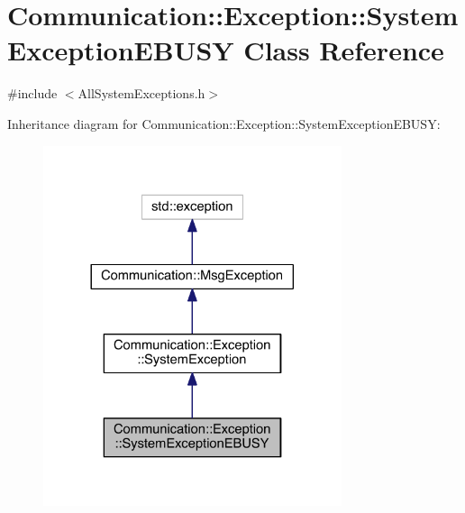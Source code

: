 \hypertarget{class_communication_1_1_exception_1_1_system_exception_e_b_u_s_y}{}\section{Communication\+:\+:Exception\+:\+:System\+Exception\+E\+B\+U\+S\+Y Class Reference}
\label{class_communication_1_1_exception_1_1_system_exception_e_b_u_s_y}


{\ttfamily \#include $<$All\+System\+Exceptions.\+h$>$}



Inheritance diagram for Communication\+:\+:Exception\+:\+:System\+Exception\+E\+B\+U\+S\+Y\+:\nopagebreak
\begin{figure}[H]
\begin{center}
\leavevmode
\includegraphics[width=248pt]{class_communication_1_1_exception_1_1_system_exception_e_b_u_s_y__inherit__graph}
\end{center}
\end{figure}


